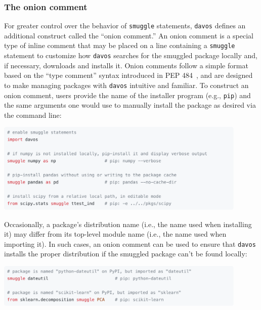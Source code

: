 \documentclass[preprint,12pt,a4paper]{elsarticle}
\begin{document}
\subsubsection{The onion comment}\label{subsec:onion}
For greater control over the behavior of \texttt{smuggle} statements, \texttt{davos} defines an additional construct called the ``onion comment.'' An onion comment is a special type of inline comment that may be placed on a line containing a \texttt{smuggle} statement to customize how \texttt{davos} searches for the smuggled package locally and, if necessary, downloads and installs it. Onion comments follow a simple format based on the ``type comment'' syntax introduced in PEP 484~\cite{vanREtal14}, and are designed to make managing packages with \texttt{davos} intuitive and familiar. To construct an onion comment, users provide the name of the installer program (e.g., \texttt{pip}) and the same arguments one would use to manually install the package as desired via the command line:
\begin{center}
\includegraphics[width=0.9\textwidth]{figs/snippet1}
\end{center}
Occasionally, a package's distribution name (i.e., the name used when installing it) may differ from its top-level module name (i.e., the name used when importing it). In such cases, an onion comment can be used to ensure that \texttt{davos} installs the proper distribution if the smuggled package can't be found locally:
\begin{center}
\includegraphics[width=0.9\textwidth]{figs/snippet2}
\end{center}
\end{document}
